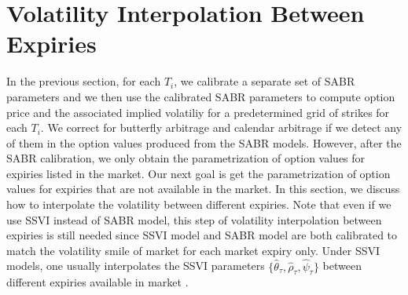 \documentclass[letterpaper,12pt,titlepage,oneside,final]{book}
\numberwithin{equation}{section}
\theoremstyle{definition}
\begin{document}














\section{Volatility Interpolation Between Expiries}
In the previous section, for each $T_i$, we calibrate a separate set of SABR parameters and we then use the calibrated SABR parameters to compute option price and the associated implied volatiliy for a predetermined grid of strikes for each $T_i$. We correct for butterfly arbitrage and calendar arbitrage if we detect any of them in the option values produced from the SABR models. However, after the SABR calibration, we only obtain the parametrization of  option values for expiries listed in the market. Our next goal is get  the parametrization of option values for expiries that are not available in the market. In this section, we discuss how to interpolate the volatility between different expiries. Note that even if we use SSVI instead of SABR model, this step of volatility interpolation between expiries is still needed since SSVI model and SABR model are both calibrated to match the volatility smile of market for each market expiry only. Under SSVI models, one usually interpolates   the SSVI parameters $\{\hat{\theta}_{\tau},\hat{\rho}_{\tau},\hat{\psi}_{\tau}\}$ between different expiries available in market \cite{corbetta2019robust}.
\end{document}
